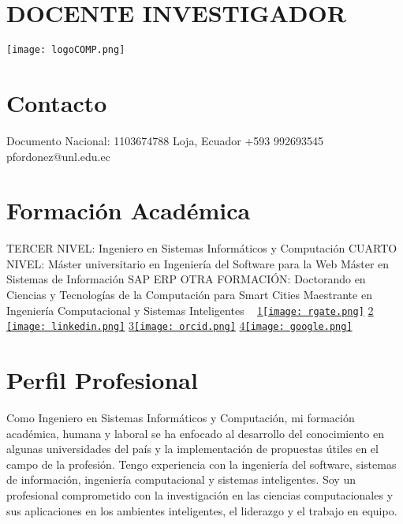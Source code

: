 \documentclass[]{cv-style} %
\begin{document}
\hfill

\begin{aside}

\section{DOCENTE INVESTIGADOR} 

\hfill

\texttt{[image: logoCOMP.png]}
\section{Contacto}
Documento Nacional: 1103674788
Loja, Ecuador
+593 992693545
pfordonez@unl.edu.ec

\section{Formación Académica}
TERCER NIVEL:
Ingeniero en Sistemas Informáticos y Computación
CUARTO NIVEL:
Máster universitario en Ingeniería del Software para la Web
Máster en Sistemas de Información SAP ERP
OTRA FORMACIÓN:
Doctorando en Ciencias y Tecnologías de la Computación para Smart Cities
Maestrante en Ingeniería Computacional y Sistemas Inteligentes 
~
\href{https://www.researchgate.net/profile/Pablo_Ordonez-Ordonez}{1\texttt{[image: rgate.png]}}
\hfill
\href{https://www.linkedin.com/in/pfordonez/}{2 \texttt{[image: linkedin.png]}}
\hfill
\href{https://orcid.org/0000-0001-8079-7694}{3\texttt{[image: orcid.png]}}
\hfill
\href{https://scholar.google.com/citations?hl=es&authuser=1&user=3q7qBpwAAAAJ}{4\texttt{[image: google.png]}}

\end{aside}

\small
\section{Perfil Profesional}
  \vspace{-0.3cm}
\small
Como Ingeniero en Sistemas Informáticos y Computación, mi formación académica, humana y laboral se ha enfocado al desarrollo del conocimiento en algunas universidades del país y la implementación de propuestas útiles en el campo de la profesión. Tengo experiencia con la ingeniería del software, sistemas de información, ingeniería computacional y sistemas inteligentes. Soy un profesional comprometido con la investigación en las ciencias computacionales y sus aplicaciones en los ambientes inteligentes, el liderazgo y el trabajo en equipo.
\end{document}
